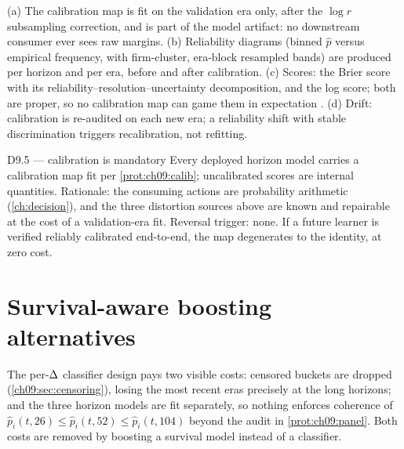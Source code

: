 \begin{protocol}\label{prot:ch09:calib}
(a) The calibration map is fit on the validation era only, after the
$\log r$ subsampling correction, and is part of the model artifact: no
downstream consumer ever sees raw margins. (b) Reliability diagrams
(binned $\hat p$ versus empirical frequency, with firm-cluster,
era-block resampled bands) are produced per horizon and per era, before
and after calibration. (c) Scores: the Brier score with its
reliability--resolution--uncertainty decomposition, and the log score;
both are proper, so no calibration map can game them in expectation
\citep{gneitingraftery2007}. (d) Drift: calibration is re-audited on
each new era; a reliability shift with stable discrimination triggers
recalibration, not refitting.
\end{protocol}

\begin{decision}{D9.5 --- calibration is mandatory}
Every deployed horizon model carries a calibration map fit per
\cref{prot:ch09:calib}; uncalibrated scores are internal quantities.
Rationale: the consuming actions are probability arithmetic
(\cref{ch:decision}), and the three distortion sources above are known
and repairable at the cost of a validation-era fit. Reversal trigger:
none. If a future learner is verified reliably calibrated end-to-end,
the map degenerates to the identity, at zero cost.
\end{decision}

\section{Survival-aware boosting alternatives}\label{ch09:sec:aft}

The per-$\Delta$ classifier design pays two visible costs: censored
buckets are dropped (\cref{ch09:sec:censoring}), losing the most recent
eras precisely at the long horizons; and the three horizon models are
fit separately, so nothing enforces coherence of
$\hat p_i(t, 26) \le \hat p_i(t, 52) \le \hat p_i(t, 104)$ beyond the
audit in \cref{prot:ch09:panel}. Both costs are removed by boosting a
survival model instead of a classifier.

